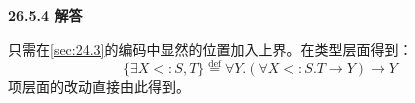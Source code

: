 \begin{taplauthorsolutionentrybox}
\label{sol:author:26.5.4}
\textbf{26.5.4 解答}

只需在\cref{sec:24.3}的编码中显然的位置加入上界。在类型层面得到：
\[
\{\exists X<:S,T\}
\overset{\mathrm{def}}{=}
\forall Y.(\forall X<:S.T\to Y)\to Y
\]
项层面的改动直接由此得到。
\end{taplauthorsolutionentrybox}
